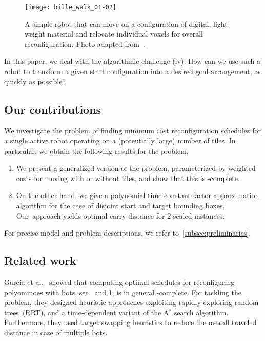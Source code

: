 \begin{figure}
    \centering
    \texttt{[image: bille\_walk\_01-02]}
    \caption{A simple \BILLE robot that can move on a configuration of digital, light-weight
material and relocate individual voxels for overall reconfiguration. Photo adapted from~\cite{jenett2019material}.}
    \label{fig:intro-bille}
\end{figure}

In this paper, we deal with the algorithmic challenge (iv): How can we use such a robot to transform a given start configuration
into a desired goal arrangement, as quickly as possible?

\subsection{Our contributions}\label{subsec:our-results}

We investigate the problem of finding minimum cost reconfiguration schedules for a single active
robot operating on a (potentially large) number of tiles.
In particular, we obtain the following results for the \probName problem.
\begin{enumerate}[(1)]
	\item {We present a generalized version of the problem, parameterized by weighted costs for moving with or without tiles, and show that this is \NP-complete.}
	\item {On the other hand, we give a polynomial-time constant-factor approximation algorithm for the case of disjoint start and target bounding boxes.
	Our~approach yields optimal carry distance for $2$-scaled instances.}
\end{enumerate}

For precise model and problem descriptions, we refer to~\cref{subsec:preliminaries}.


\subsection{Related work}\label{subsec:related-work}

Garcia et al.~\cite{single-bille-reconfig-IROS,cooperative-bille-reconfig-ICRA} showed that computing optimal schedules for reconfiguring polyominoes with \BILLE bots, see~\cite{jenett2017bille} and \cref{fig:intro-bille}, is in general \NP-complete.
For tackling the problem, they designed heuristic approaches exploiting rapidly exploring random trees~(RRT), and a time-dependent variant of the A$^{*}$ search algorithm.
Furthermore, they used target swapping heuristics to reduce the overall traveled distance in case of multiple \BILLE bots.

